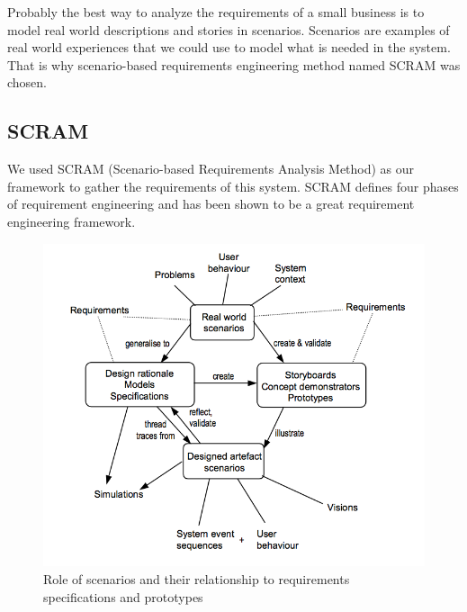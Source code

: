 Probably the best way to analyze the requirements of a small business is to model real world descriptions and stories in scenarios. Scenarios are examples of real world experiences that we could use to model what is needed in the system. That is why scenario-based requirements engineering method named SCRAM was chosen.

\subsection{SCRAM}
We used SCRAM (Scenario-based Requirements Analysis Method) as our framework to gather the requirements of this system.
SCRAM defines four phases of requirement engineering and has been shown to be a great requirement engineering framework.


\begin{figure}[htb!p]
\centering
\includegraphics[width=\linewidth]{fig/REscenario.png}
  \caption{Role of scenarios and their relationship to requirements specifications and prototypes ~\cite{REScenario}}
\label{fig:REscenario}
\end{figure}


